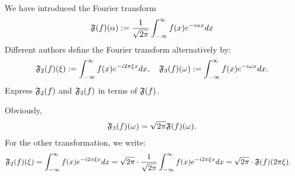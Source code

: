 \documentclass[11pt]{article}
\begin{document}
\begin{exercise}[Extra]
    We have introduced the Fourier transform 
    \begin{align*}
        \mathfrak{F}(f)(\alpha) := \frac{1}{\sqrt{2\pi}}\int_{-\infty}^{\infty} f(x) e^{-i \alpha x} dx
    \end{align*}
    Different authors define the Fourier transform alternatively by:
    \begin{align*}
        \mathfrak{F}_2(f)(\xi) 
        := \int_{-\infty}^{\infty} f(x) e^{-i 2\pi \xi x} dx
        ,
        \quad 
        \mathfrak{F}_3(f)(\omega) 
        := \int_{-\infty}^{\infty} f(x) e^{-i \omega x} dx
        .
    \end{align*}
    Express $\mathfrak{F}_{2}(f)$ and $\mathfrak{F}_{3}(f)$ in terms of $\mathfrak{F}(f)$.
\end{exercise}
\begin{solution}    
    Obviously, 
    \begin{align*}
        \mathfrak{F}_{3}(f)(\omega) = \sqrt{2\pi} \mathfrak{F}(f)(\omega).
    \end{align*}
    For the other transformation, we write:
    \begin{align*}
        \mathfrak{F}_2(f)(\xi) 
        &
        = 
        \int_{-\infty}^{\infty} f(x) e^{-i 2\pi \xi x} dx
        = 
        \sqrt{2\pi} 
        \cdot 
        \frac{1}{\sqrt{2\pi}}
        \int_{-\infty}^{\infty} f(x) e^{-i 2\pi \xi x} dx
        = 
        \sqrt{2\pi} 
        \cdot 
        \mathfrak{F}(f)( 2\pi \xi )
        .
    \end{align*}
\end{solution}
\end{document}
